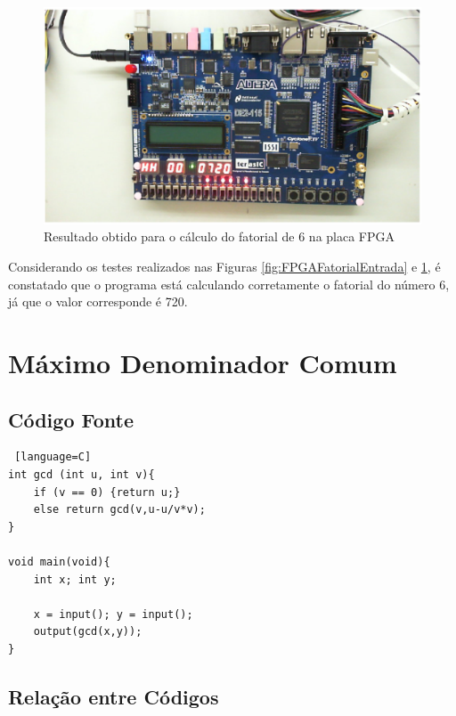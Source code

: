\documentclass[
	12pt,				%
	oneside,
	a4paper,			%
	english,			%
	french,				%
	spanish,			%
	brazil,				%
	]{abntex2}
\begin{document}
\begin{figure}[H]
\centering 
\caption{Resultado obtido para o cálculo do fatorial de 6 na placa FPGA} 
\label{fig:FPGAFatorialSaida}
\graphicspath{ {./imgs/} } 
\includegraphics[scale=0.43]{imgs/Resultados/Fatorial_FPGA_Saida.png}
\end{figure}

Considerando os testes realizados nas Figuras \ref{fig:FPGAFatorialEntrada} e \ref{fig:FPGAFatorialSaida}, é constatado que o programa está calculando corretamente o fatorial do número 6, já que o valor corresponde é 720.

\section{Máximo Denominador Comum}

\subsection{Código Fonte}
\begin{lstlisting} [language=C]
int gcd (int u, int v){ 	
    if (v == 0) {return u;}
    else return gcd(v,u-u/v*v);
}

void main(void){	
    int x; int y;

    x = input(); y = input();
    output(gcd(x,y));
}
\end{lstlisting}

\subsection{Relação entre Códigos}
\end{document}
